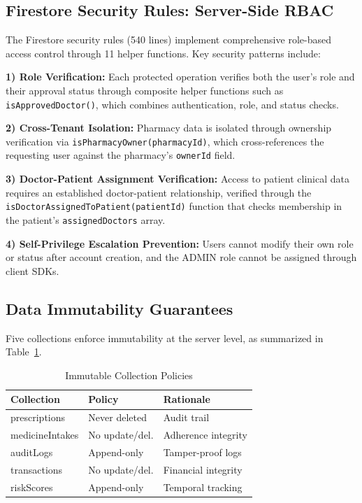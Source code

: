 \documentclass[journal,onecolumn,web]{ieeecolor}
\begin{document}
\subsection{Firestore Security Rules: Server-Side RBAC}
The Firestore security rules (540 lines) implement
comprehensive role-based access control through 11
helper functions. Key security patterns include:

{\bf 1) Role Verification:} Each protected operation
verifies both the user's role and their approval
status through composite helper functions such as
{\tt isApprovedDoctor()}, which combines
authentication, role, and status checks.

{\bf 2) Cross-Tenant Isolation:} Pharmacy data is
isolated through ownership verification via
{\tt isPharmacyOwner(pharmacyId)}, which
cross-references the requesting user against the
pharmacy's {\tt ownerId} field.

{\bf 3) Doctor-Patient Assignment Verification:}
Access to patient clinical data requires an
established doctor-patient relationship, verified
through the
{\tt isDoctorAssignedToPatient(patientId)} function
that checks membership in the patient's
{\tt assignedDoctors} array.

{\bf 4) Self-Privilege Escalation Prevention:} Users
cannot modify their own role or status after account
creation, and the ADMIN role cannot be assigned
through client SDKs.

\subsection{Data Immutability Guarantees}
Five collections enforce immutability at the server
level, as summarized in Table~\ref{tab:immutability}.

\begin{table}[!t]
\caption{Immutable Collection Policies}
\label{tab:immutability}
\centering\small
\begin{tabular}{l l l}
\toprule
{\bf Collection} & {\bf Policy}
& {\bf Rationale} \\
\midrule
prescriptions & Never deleted
& Audit trail \\
medicineIntakes & No update/del.
& Adherence integrity \\
auditLogs & Append-only
& Tamper-proof logs \\
transactions & No update/del.
& Financial integrity \\
riskScores & Append-only
& Temporal tracking \\
\bottomrule
\end{tabular}
\end{table}
\end{document}
